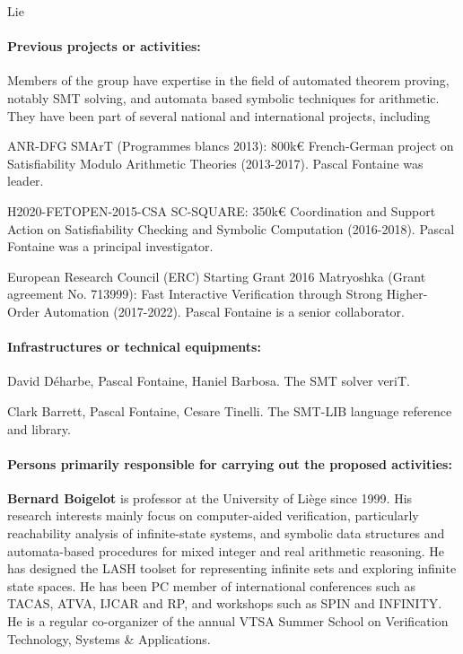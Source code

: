 \begin{sitedescription}{Lie}
\paragraph*{Previous projects or activities:}

Members of the group have expertise in the field of automated theorem proving, notably SMT solving, and automata based symbolic techniques for arithmetic.  They have been part of several national and international projects, including
\begin{compactitem}
\item ANR-DFG SMArT (Programmes blancs 2013): 800k€ French-German project on Satisfiability Modulo Arithmetic Theories (2013-2017).  Pascal Fontaine was leader.
\item H2020-FETOPEN-2015-CSA SC-SQUARE: 350k€ Coordination and Support Action on Satisfiability Checking and Symbolic Computation (2016-2018).  Pascal Fontaine was a principal investigator.
\item European Research Council (ERC) Starting Grant 2016 Matryoshka (Grant
  agreement No. 713999): Fast Interactive Verification through Strong
  Higher-Order Automation (2017-2022).  Pascal Fontaine is a senior
  collaborator.
\end{compactitem}

\paragraph*{Infrastructures or technical equipments:}


\begin{compactitem}
\item David Déharbe, Pascal Fontaine, Haniel Barbosa.  The SMT solver veriT.
\item Clark Barrett, Pascal Fontaine, Cesare Tinelli. The SMT-LIB language reference and library.
\end{compactitem}

\paragraph*{Persons primarily responsible for carrying out the proposed activities:}

\begin{compactitem}
\item{\bf Bernard Boigelot} is professor at the University of Liège
  since 1999.  His research interests mainly focus on computer-aided
  verification, particularly reachability analysis of infinite-state
  systems, and symbolic data structures and automata-based procedures
  for mixed integer and real arithmetic reasoning.  He has designed
  the LASH toolset for representing infinite sets and exploring
  infinite state spaces. He has been PC member of international
  conferences such as TACAS, ATVA, IJCAR and RP, and workshops such as
  SPIN and INFINITY. He is a regular co-organizer of the annual VTSA
  Summer School on Verification Technology, Systems \& Applications.


\end{compactitem}
\end{sitedescription}
